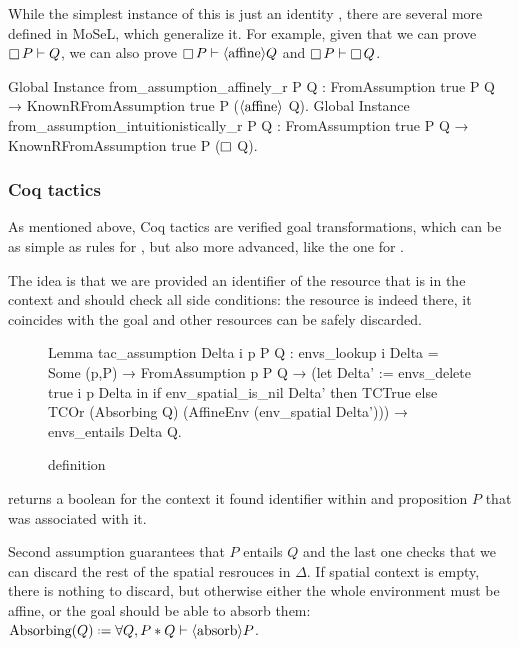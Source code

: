 While the simplest instance of this is just an identity , there are several more defined in MoSeL, which generalize it.
For example, given that we can prove \(\mathop{\Box} P \vdash Q\), we can also prove \(\mathop{\Box} P \vdash \langle\text{affine}\rangle Q\) and  \(\mathop{\Box} P \vdash \mathop{\Box} Q\).
\begin{coq}
Global Instance from_assumption_affinely_r P Q :
  FromAssumption true P Q → KnownRFromAssumption true P ($\langle\text{affine}\rangle$ Q).
Global Instance from_assumption_intuitionistically_r P Q :
  FromAssumption true P Q → KnownRFromAssumption true P ($\mathop{\Box}$ Q).
\end{coq}

\subsubsection{Coq tactics}
\label{sec:coq-tactics}

As mentioned above, Coq tactics are verified goal transformations, which can be as simple as rules for , but also more advanced, like the one for .

The idea is that we are provided an identifier of the resource that is in the context and should check all side conditions: the resource is indeed there, it coincides with the goal and other resources can be safely discarded.

\begin{figure}[H]
\begin{coq}
Lemma tac_assumption Delta i p P Q :
  envs_lookup i Delta = Some (p,P) →
  FromAssumption p P Q →
  (let Delta' := envs_delete true i p Delta in
   if env_spatial_is_nil Delta' then TCTrue
   else TCOr (Absorbing Q) (AffineEnv (env_spatial Delta'))) →
  envs_entails Delta Q.
\end{coq}  
\caption{ definition}
\label{fig:tac-assumption}
\end{figure}

 returns a boolean for the context it found identifier  within and proposition \(P\) that was associated with it.

Second assumption guarantees that \(P\) entails \(Q\) and the last one checks that we can discard the rest of the spatial resrouces in \(\Delta\).
If spatial context is empty, there is nothing to discard, but otherwise either the whole environment must be affine, or the goal should be able to absorb them:
\(\Absorbing Q \defeq \forall Q, P * Q \vdash \absorb P\).

